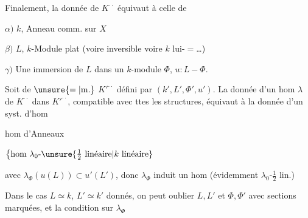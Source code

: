 

Finalement, la donnée de $K^{\cdot\cdot}$ équivaut à celle de

$\alpha)$ $k$, Anneau comm. sur $X$

$\beta)$ $L$, $k$-Module plat (voire inversible voire $k$ lui-$=$\ldots)

$\gamma)$ Une immersion de $L$ dans un $k$-module $\Phi$, $u:L\mathbin{-}\Phi$.

Soit de $\unsure{=|\mathrm{m.}}$ $K'^{\cdot\cdot}$ défini par $(k',L',\Phi',u')$.  La donnée d'un hom $\lambda$ de $K^{\cdot\cdot}$ dans $K'^{\cdot\cdot}$, compatible avec ttes les structures, équivaut à la donnée d'un syst. d'hom

hom d'Anneaux


$\left\{\text{hom $\lambda_0$-}\unsure{\tfrac12\text{ linéaire}|k\text{ linéaire}}\right.$

avec $\lambda_\Phi(u(L))\subset u'(L')$, donc $\lambda_\Phi$
induit un hom (évidemment $\lambda_0$-$\frac12$ lin.)

Dans le cas $L\simeq k$, $L'\simeq k'$ donnés, on peut oublier $L,L'$ et  $\Phi,\Phi'$ avec sections marquées, et la condition sur $\lambda_\Phi$


